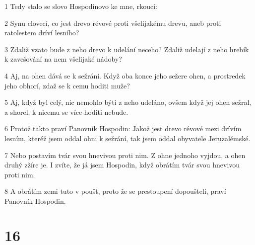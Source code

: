 \par 1 Tedy stalo se slovo Hospodinovo ke mne, rkoucí:
\par 2 Synu clovecí, co jest drevo révové proti všelijakému drevu, aneb proti ratolestem dríví lesního?
\par 3 Zdaliž vzato bude z neho drevo k udelání neceho? Zdaliž udelají z neho hrebík k zavešování na nem všelijaké nádoby?
\par 4 Aj, na ohen dává se k sežrání. Když oba konce jeho sežere ohen, a prostredek jeho obhorí, zdaž se k cemu hoditi muže?
\par 5 Aj, když byl celý, nic nemohlo býti z neho udeláno, ovšem když jej ohen sežral, a shorel, k nicemu se více hoditi nebude.
\par 6 Protož takto praví Panovník Hospodin: Jakož jest drevo révové mezi drívím lesním, kteréž jsem oddal ohni k sežrání, tak jsem oddal obyvatele Jeruzalémské.
\par 7 Nebo postavím tvár svou hnevivou proti nim. Z ohne jednoho vyjdou, a ohen druhý zžíre je. I zvíte, že já jsem Hospodin, když obrátím tvár svou hnevivou proti nim.
\par 8 A obrátím zemi tuto v poušt, proto že se prestoupení dopoušteli, praví Panovník Hospodin.

\chapter{16}

